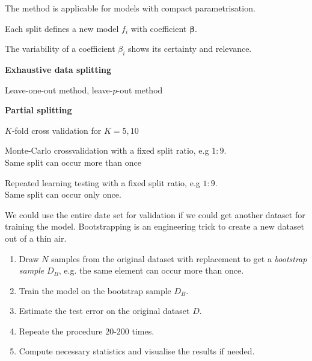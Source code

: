 \documentclass[landscape,footrule]{foils}
\renewcommand{\vec}[1]{\boldsymbol{#1}}
\begin{document}
\vspace*{-.5cm}
\begin{triangles}
\item The method is applicable for models with compact parametrisation.
\item Each split defines a new model $f_i$ with coefficient $\vec{\beta}$.   
\item The variability of a coefficient $\beta_i$ shows its certainty and relevance. 
\end{triangles}



\textbf{Exhaustive data splitting}
\begin{triangles}
\item Leave-one-out method, leave-$p$-out method
\end{triangles}
\vspace*{1cm}

\textbf{Partial splitting}
\begin{triangles}
\item $K$-fold cross validation for $K = 5 , 10$ 
\item Monte-Carlo crossvalidation with a fixed split ratio, e.g $1:9$.\\ Same split can occur more than once  
\item Repeated learning testing with  a fixed split ratio, e.g $1:9$.
\\ Same split can occur only once. 
\end{triangles}



We could use the entire date set for validation if we could get another dataset for training the model. Bootstrapping is an engineering trick to create a new dataset out of a thin air.
\begin{enumerate}
\item Draw $N$ samples from the original dataset with replacement to get a \emph{bootstrap sample} $D_{B}$, e.g. the same element can occur more than once.
\item Train the model  on the bootstrap sample $D_B$.
\item Estimate the test error on the original dataset $D$.
\item Repeate the procedure $20$-$200$ times.
\item Compute necessary statistics and visualise the results if needed.
\end{enumerate}
\end{document}
